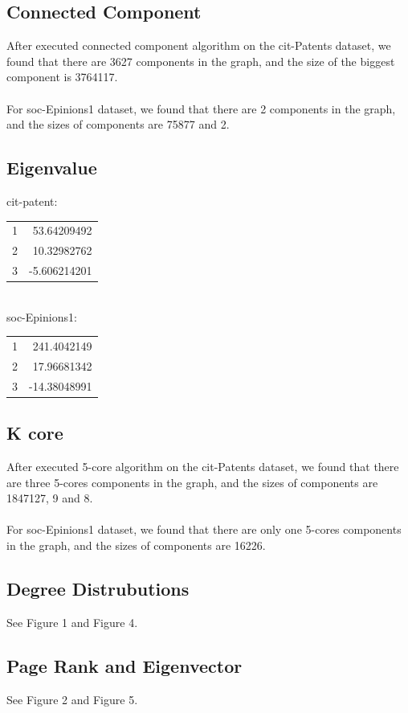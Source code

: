 \subsection{Connected Component}
After executed connected component algorithm on the cit-Patents dataset, we found that there are 3627 components in the graph, and the size of the biggest component is 3764117. \\
\\
For soc-Epinions1 dataset, we found that there are 2 components in the graph, and the sizes of components are 75877 and 2. \\
\subsection{Eigenvalue}
cit-patent:\\
\begin{tabular}{ l r }
1 & 53.64209492\\
2 & 10.32982762\\
3 & -5.606214201\\
\end{tabular}
\\
soc-Epinions1:\\
\begin{tabular}{ l r }
1& 241.4042149\\
2 & 17.96681342\\
3 & -14.38048991\\
\end{tabular}
\subsection{K core}
After executed 5-core algorithm on the cit-Patents dataset, we found that there are three 5-cores components in the graph, and the sizes of components are 1847127, 9 and 8. \\
\\
For soc-Epinions1 dataset, we found that there are only one 5-cores components in the graph, and the sizes of components are 16226. \\
\subsection{Degree Distrubutions}
See Figure 1 and Figure 4.\\
\subsection{Page Rank and Eigenvector}
See Figure 2 and Figure 5.\\
